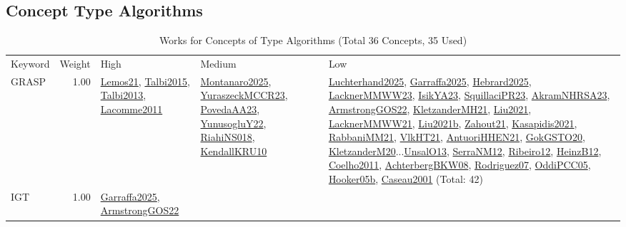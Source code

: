 \subsection{Concept Type Algorithms}
\label{sec:Algorithms}
\label{Algorithms}
{\scriptsize
\begin{longtable}{p{3cm}r>{\raggedright\arraybackslash}p{6cm}>{\raggedright\arraybackslash}p{6cm}>{\raggedright\arraybackslash}p{8cm}}
\rowcolor{white}\caption{Works for Concepts of Type Algorithms (Total 36 Concepts, 35 Used)}\\ \toprule
\rowcolor{white}Keyword & Weight & High & Medium & Low\\ \midrule\endhead
\bottomrule
\endfoot
\index{GRASP}\index{Algorithms!GRASP}GRASP &  1.00 & \hyperref[detail:Lemos21]{Lemos21}, \hyperref[detail:Talbi2015]{Talbi2015}, \hyperref[detail:Talbi2013]{Talbi2013}, \hyperref[detail:Lacomme2011]{Lacomme2011} & \hyperref[detail:Montanaro2025]{Montanaro2025}, \hyperref[detail:YuraszeckMCCR23]{YuraszeckMCCR23}, \hyperref[detail:PovedaAA23]{PovedaAA23}, \hyperref[detail:YunusogluY22]{YunusogluY22}, \hyperref[detail:RiahiNS018]{RiahiNS018}, \hyperref[detail:KendallKRU10]{KendallKRU10} & \hyperref[detail:Luchterhand2025]{Luchterhand2025}, \hyperref[detail:Garraffa2025]{Garraffa2025}, \hyperref[detail:Hebrard2025]{Hebrard2025}, \hyperref[detail:LacknerMMWW23]{LacknerMMWW23}, \hyperref[detail:IsikYA23]{IsikYA23}, \hyperref[detail:SquillaciPR23]{SquillaciPR23}, \hyperref[detail:AkramNHRSA23]{AkramNHRSA23}, \hyperref[detail:ArmstrongGOS22]{ArmstrongGOS22}, \hyperref[detail:KletzanderMH21]{KletzanderMH21}, \hyperref[detail:Liu2021]{Liu2021}, \hyperref[detail:LacknerMMWW21]{LacknerMMWW21}, \hyperref[detail:Liu2021b]{Liu2021b}, \hyperref[detail:Zahout21]{Zahout21}, \hyperref[detail:Kasapidis2021]{Kasapidis2021}, \hyperref[detail:RabbaniMM21]{RabbaniMM21}, \hyperref[detail:VlkHT21]{VlkHT21}, \hyperref[detail:AntuoriHHEN21]{AntuoriHHEN21}, \hyperref[detail:GokGSTO20]{GokGSTO20}, \hyperref[detail:KletzanderM20]{KletzanderM20}...\hyperref[detail:UnsalO13]{UnsalO13}, \hyperref[detail:SerraNM12]{SerraNM12}, \hyperref[detail:Ribeiro12]{Ribeiro12}, \hyperref[detail:HeinzB12]{HeinzB12}, \hyperref[detail:Coelho2011]{Coelho2011}, \hyperref[detail:AchterbergBKW08]{AchterbergBKW08}, \hyperref[detail:Rodriguez07]{Rodriguez07}, \hyperref[detail:OddiPCC05]{OddiPCC05}, \hyperref[detail:Hooker05b]{Hooker05b}, \hyperref[detail:Caseau2001]{Caseau2001} (Total: 42)\\
\index{IGT}\index{Algorithms!IGT}IGT &  1.00 & \hyperref[detail:Garraffa2025]{Garraffa2025}, \hyperref[detail:ArmstrongGOS22]{ArmstrongGOS22} &  & \\

\end{longtable}}
